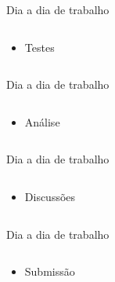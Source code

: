 \begin{frame}{Dia a dia de trabalho}
  \begin{columns}
    \begin{column}{5cm}
      \begin{itemize}
        \item Testes
      \end{itemize}  
    \end{column}
      \begin{column}{5cm}
      \end{column}
  \end{columns}
\end{frame}

\begin{frame}{Dia a dia de trabalho}
  \begin{columns}
    \begin{column}{5cm}
      \begin{itemize}
        \item Análise
      \end{itemize}  
    \end{column}
      \begin{column}{5cm}
      \end{column}
  \end{columns}
\end{frame}

\begin{frame}{Dia a dia de trabalho}
  \begin{columns}
    \begin{column}{5cm}
      \begin{itemize}
        \item Discussões
      \end{itemize}  
    \end{column}
      \begin{column}{5cm}        
      \end{column}
  \end{columns}
\end{frame}

\begin{frame}{Dia a dia de trabalho}
  \begin{columns}
    \begin{column}{5cm}
      \begin{itemize}
        \item Submissão
      \end{itemize}  
    \end{column}
      \begin{column}{5cm}
      \end{column}
  \end{columns}
\end{frame}

